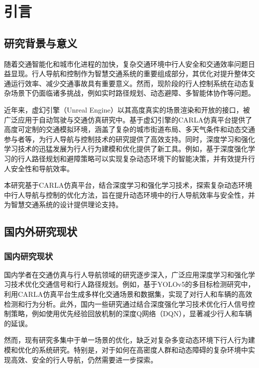 \chapter{引言}

\section{研究背景与意义}

随着交通智能化和城市化进程的加快，复杂交通环境中行人安全和交通效率问题日益显现。行人导航和控制作为智慧交通系统的重要组成部分，其优化对提升整体交通运行效率、减少交通事故具有重要意义。然而，现阶段的行人控制系统在动态复杂场景下仍面临诸多挑战，例如实时路径规划、动态避障、多智能体协作等问题。

近年来，虚幻引擎（Unreal Engine）以其高度真实的场景渲染和开放的接口，被广泛应用于自动驾驶与交通仿真研究中。基于虚幻引擎的CARLA仿真平台提供了高度可定制的交通模拟环境，涵盖了复杂的城市街道布局、多天气条件和动态交通参与者等，为行人导航与控制技术的研究提供了高效支持。同时，深度学习和强化学习技术的迅猛发展为行人行为建模和优化提供了新工具。例如，基于深度强化学习的行人路径规划和避障策略可以实现复杂动态环境下的智能决策，并有效提升行人安全性和导航效率。

本研究基于CARLA仿真平台，结合深度学习和强化学习技术，探索复杂动态环境中行人导航与控制的优化方法，旨在提升动态环境中的行人导航效率与安全性，并为智慧交通系统的设计提供理论支持。

\section{国内外研究现状}

\subsection{国内研究现状}

国内学者在交通仿真与行人导航领域的研究逐步深入，广泛应用深度学习和强化学习技术优化交通信号和行人路径规划。例如，基于YOLOv5的多目标检测研究中，利用CARLA仿真平台生成多样化交通场景和数据集，实现了对行人和车辆的高效检测和行为分析。此外，国内一些研究通过结合深度强化学习技术优化行人信号控制策略，例如使用优先经验回放机制的深度Q网络（DQN），显著减少行人和车辆的延误。

然而，现有研究多集中于单一场景的优化，缺乏对复杂多变动态环境下行人行为建模和优化的系统研究。特别是，对于如何在高密度人群和动态障碍的复杂环境中实现高效、安全的行人导航，仍然需要进一步探索。

